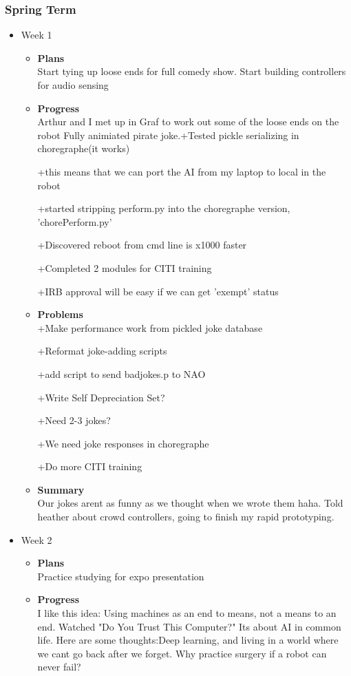 	\subsubsection{Spring Term}
	\begin{itemize}
		\item{Week 1}
			\begin{itemize}
				\item \textbf{Plans} \\
					Start tying up loose ends for full comedy show. Start building controllers for audio sensing
				\item \textbf{Progress} \\
					Arthur and I met up in Graf to work out some of the loose ends on the robot
					Fully animiated pirate joke.+Tested pickle serializing in choregraphe(it works) 

					+this means that we can port the AI from my laptop to local in the robot 

					+started stripping perform.py into the choregraphe version, 'chorePerform.py' 

					+Discovered reboot from cmd line is x1000 faster 

					+Completed 2 modules for CITI training 

					+IRB approval will be easy if we can get 'exempt' status 
				\item \textbf{Problems} \\
					+Make performance work from pickled joke database 

					+Reformat joke-adding scripts 

					+add script to send badjokes.p to NAO 

					+Write Self Depreciation Set? 

					+Need 2-3 jokes? 

					+We need joke responses in choregraphe 

					+Do more CITI training 
				\item \textbf{Summary} \\
					Our jokes arent as funny as we thought when we wrote them haha. Told heather about crowd controllers, going to finish my rapid prototyping.
			\end{itemize}

		\item{Week 2}
			\begin{itemize}
				\item \textbf{Plans} \\
					Practice studying for expo presentation
				\item \textbf{Progress} \\
					I like this idea: Using machines as an end to means, not a means to an end. Watched "Do You Trust This Computer?"
					Its about AI in common life. Here are some thoughts:Deep learning, and living in a world where we cant go back after we forget. Why practice surgery if a robot can never fail? 


\end{itemize}
\end{itemize}
